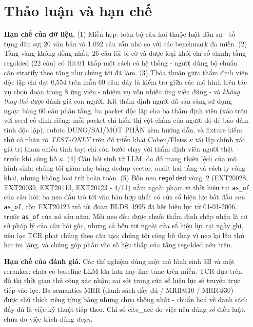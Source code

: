 \documentclass[11pt,a4paper]{article}
\begin{document}
\section{Thảo luận và hạn chế}

\textbf{Hạn chế của dữ liệu.} (1) Miền hẹp: toàn bộ câu hỏi thuộc luật dân sự - tố tụng dân sự; 20 văn bản và 1.092 câu vẫn nhỏ so với các benchmark đa miền. (2) Tầng vàng không đồng nhất: 26 câu lõi bị cờ và được loại khỏi chỉ số chính; tầng regolded (22 câu) có Hit@1 thấp một cách có hệ thống - người dùng bộ chuẩn cần stratify theo tầng như chúng tôi đã làm. (3) Thỏa thuận giữa thẩm định viên độc lập chỉ đạt 0,554 trên mẫu 60 câu; đây là kiểm tra giữa các mô hình trên tác vụ chọn đoạn trong 8 ứng viên - nhiệm vụ vốn nhiều ứng viên đúng - và \emph{không thay thế được} đánh giá con người. Kit thẩm định người đã sẵn sàng sử dụng ngay: bảng 60 câu phân tầng, ba packet độc lập cho ba thẩm định viên (xáo trộn với seed cố định riêng; mỗi packet chỉ hiển thị cột chấm của người đó để bảo đảm tính độc lập), rubric DUNG/SAI/MỘT PHẦN kèm hướng dẫn, và fixture kiểm thử có nhãn rõ \emph{TEST-ONLY} trên đó triển khai Cohen/Fleiss $\kappa$ tái lập chính xác giá trị tham chiếu tính tay; chỉ còn bước chạy với thẩm định viên người thật trước khi công bố $\kappa$. (4) Câu hỏi sinh từ LLM, do đó mang thiên lệch của mô hình sinh; chúng tôi giảm nhẹ bằng dedup vector, audit hai tầng và cách ly công khai, nhưng không loại trừ hoàn toàn. (5) Bốn neo \texttt{regolded} vòng~2 (EXT20028, EXT20039, EXT20113, EXT20123 - 4/11) nằm ngoài phạm vi thời hiệu tại \texttt{as\_of} của câu hỏi: ba neo đầu trỏ tới văn bản hợp nhất có cửa sổ hiệu lực bắt đầu \emph{sau} \texttt{as\_of}, còn EXT20123 trỏ tới đoạn BLDS~1995 đã hết hiệu lực từ 01-01-2006, trước \texttt{as\_of} của nó sáu năm. Mỗi neo đều được chuỗi thẩm định chấp nhận là cơ sở pháp lý của câu hỏi gốc, nhưng cả bốn rơi ngoài cửa sổ hiệu lực tại ngày ghi, nên lọc TCR phạt chúng theo cấu tạo; chúng tôi công bố thay vì neo lại lần thứ hai im lặng, và chúng góp phần vào số liệu thấp của tầng regolded nêu trên.

\textbf{Hạn chế của đánh giá.} Các thí nghiệm dùng một mô hình sinh 3B và một reranker; chưa có baseline LLM lớn hơn hay fine-tune trên miền. TCR dựa trên đồ thị thời gian thủ công xác nhận; sai sót trong cửa sổ hiệu lực sẽ truyền trực tiếp vào lọc. Ba semantics MRR (danh sách đầy đủ / MRR@10 / MRR@30) được chú thích riêng từng bảng nhưng chưa thống nhất - chuẩn hoá về danh sách đầy đủ là việc kỹ thuật tiếp theo. Chỉ số cite\_acc đo việc nêu đúng \emph{số} điều luật, chưa đo việc trích đúng \emph{đoạn}.
\end{document}
